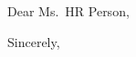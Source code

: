 \begin{coverletter}
	Dear Ms.\ HR Person,

	\vspace{3ex}

	\lipsum[1]

	\vspace{1.5ex}

	\lipsum[1]

	\vspace{1.5ex}

	\lipsum[1]

	\vspace{3ex}

	Sincerely,
	\printsignature
\end{coverletter}
